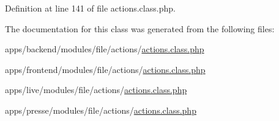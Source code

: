 Definition at line 141 of file actions.\-class.\-php.



The documentation for this class was generated from the following files\-:\begin{DoxyCompactItemize}
\item 
apps/backend/modules/file/actions/\hyperlink{backend_2modules_2file_2actions_2actions_8class_8php}{actions.\-class.\-php}\item 
apps/frontend/modules/file/actions/\hyperlink{frontend_2modules_2file_2actions_2actions_8class_8php}{actions.\-class.\-php}\item 
apps/live/modules/file/actions/\hyperlink{live_2modules_2file_2actions_2actions_8class_8php}{actions.\-class.\-php}\item 
apps/presse/modules/file/actions/\hyperlink{presse_2modules_2file_2actions_2actions_8class_8php}{actions.\-class.\-php}\end{DoxyCompactItemize}
